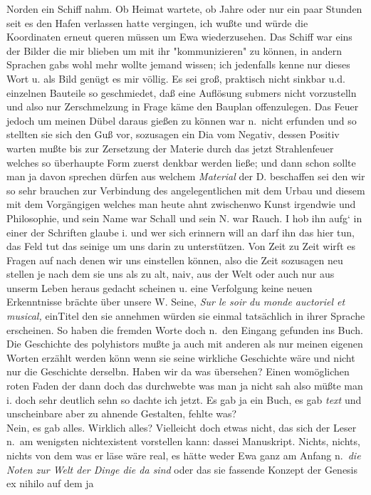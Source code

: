 \documentclass[
]{article}
\begin{document}
Norden ein Schiff nahm. Ob Heimat wartete, ob Jahre oder nur ein paar
Stunden seit es den Hafen verlassen hatte vergingen, ich wußte und würde
die Koordinaten erneut queren müssen um Ewa wiederzusehen. Das Schiff
war eins der Bilder die mir blieben um mit ihr "kommunizieren" zu
können, in andern Sprachen gabs wohl mehr wollte jemand wissen; ich
jedenfalls kenne nur dieses Wort u. als Bild genügt es mir völlig. Es
sei groß, praktisch nicht sinkbar u.d. einzelnen Bauteile so
geschmiedet, daß eine Auflösung submers nicht vorzustelln und also nur
Zerschmelzung in Frage käme den Bauplan offenzulegen. Das Feuer jedoch
um meinen Dübel daraus gießen zu können war n.~nicht erfunden und so
stellten sie sich den Guß vor, sozusagen ein Dia vom Negativ, dessen
Positiv warten mußte bis zur Zersetzung der Materie durch das jetzt
Strahlenfeuer welches so überhaupte Form zuerst denkbar werden ließe;
und dann schon sollte man ja davon sprechen dürfen aus welchem
\emph{Material }der D. beschaffen sei den wir so sehr brauchen zur
Verbindung des angelegentlichen mit dem Urbau und diesem mit dem
Vorgängigen welches man heute ahnt zwischenwo Kunst irgendwie und
Philosophie, und sein Name war Schall und sein N. war Rauch. I hob ihn
aufg` in einer der Schriften glaube i. und wer sich erinnern will an
darf ihn das hier tun, das Feld tut das seinige um uns darin zu
unterstützen. Von Zeit zu Zeit wirft es Fragen auf nach denen wir uns
einstellen können, also die Zeit sozusagen neu stellen je nach dem sie
uns als zu alt, naiv, aus der Welt oder auch nur aus unserm Leben heraus
gedacht scheinen u. eine Verfolgung keine neuen Erkenntnisse brächte
über unsere W. Seine, \emph{Sur le soir du monde auctoriel et musical,
}einTitel den sie annehmen würden sie einmal tatsächlich in ihrer
Sprache erscheinen. So haben die fremden Worte doch n.~den Eingang
gefunden ins Buch. Die Geschichte des polyhistors mußte ja auch mit
anderen als nur meinen eigenen Worten erzählt werden könn wenn sie seine
wirkliche Geschichte wäre und nicht nur die Geschichte derselbn. Haben
wir da was übersehen? Einen womöglichen roten Faden der dann doch das
durchwebte was man ja nicht sah also müßte man i. doch sehr deutlich
sehn so dachte ich jetzt. Es gab ja ein Buch, es gab \emph{text} und
unscheinbare aber zu ahnende Gestalten, fehlte was?\\
Nein, es gab alles. Wirklich alles? Vielleicht doch etwas nicht, das
sich der Leser n.~am wenigsten nichtexistent vorstellen kann: dassei
Manuskript. Nichts, nichts, nichts von dem was er läse wäre real, es
hätte weder Ewa ganz am Anfang n.~\emph{die Noten zur Welt der Dinge die
da sind} oder das sie fassende Konzept der Genesis ex nihilo auf dem ja
\end{document}
